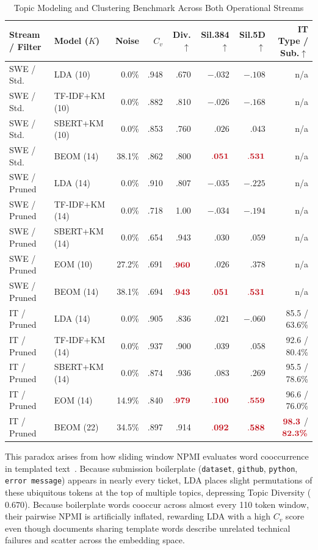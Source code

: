 \documentclass[sigconf,nonacm,pbalance]{acmart}
\newcommand{\hl}[1]{\textcolor{hlred}{\mathbf{#1}}}
\newcommand{\hlt}[1]{\textcolor{hlred}{\textbf{#1}}}
\begin{document}
\begin{table}[!htbp]
  \caption{Topic Modeling and Clustering Benchmark Across Both Operational Streams}
  \label{tab:exp1}
  \footnotesize
  \setlength{\tabcolsep}{1.35pt}
  \begin{tabular}{llrrrrrr}
    \toprule
    Stream / Filter & Model ($K$) & Noise & $C_v$ & Div.$\uparrow$ & Sil.384$\uparrow$ & Sil.5D$\uparrow$ & IT Type / Sub.$\uparrow$ \\
    \midrule
    SWE / Std. & LDA (10) & 0.0\% & .948 & .670 & $-.032$ & $-.108$ & n/a \\
    SWE / Std. & TF-IDF+KM (10) & 0.0\% & .882 & .810 & $-.026$ & $-.168$ & n/a \\
    SWE / Std. & SBERT+KM (10) & 0.0\% & .853 & .760 & $.026$ & $.043$ & n/a \\
    SWE / Std. & BEOM (14) & 38.1\% & .862 & .800 & $\hl{.051}$ & $\hl{.531}$ & n/a \\
    \addlinespace[2pt]
    SWE / Pruned & LDA (14) & 0.0\% & .910 & .807 & $-.035$ & $-.225$ & n/a \\
    SWE / Pruned & TF-IDF+KM (14) & 0.0\% & .718 & 1.00 & $-.034$ & $-.194$ & n/a \\
    SWE / Pruned & SBERT+KM (14) & 0.0\% & .654 & .943 & $.030$ & $.059$ & n/a \\
    SWE / Pruned & EOM (10) & 27.2\% & .691 & $\hl{.960}$ & $.026$ & $.378$ & n/a \\
    SWE / Pruned & BEOM (14) & 38.1\% & .694 & $\hl{.943}$ & $\hl{.051}$ & $\hl{.531}$ & n/a \\
    \addlinespace[2pt]
    IT / Pruned & LDA (14) & 0.0\% & .905 & .836 & $.021$ & $-.060$ & 85.5 / 63.6\% \\
    IT / Pruned & TF-IDF+KM (14) & 0.0\% & .937 & .900 & $.039$ & $.058$ & 92.6 / 80.4\% \\
    IT / Pruned & SBERT+KM (14) & 0.0\% & .874 & .936 & $.083$ & $.269$ & 95.5 / 78.6\% \\
    IT / Pruned & EOM (14) & 14.9\% & .840 & $\hl{.979}$ & $\hl{.100}$ & $\hl{.559}$ & 96.6 / 76.0\% \\
    IT / Pruned & BEOM (22) & 34.5\% & .897 & .914 & $\hl{.092}$ & $\hl{.588}$ & $\hlt{98.3}$ / $\hlt{82.3\%}$ \\
    \bottomrule
  \end{tabular}
\end{table}

This paradox arises from how sliding window NPMI evaluates word cooccurrence in templated text~\cite{hoyle2021automated}. Because submission boilerplate (\texttt{dataset}, \texttt{github}, \texttt{python}, \texttt{error message}) appears in nearly every ticket, LDA places slight permutations of these ubiquitous tokens at the top of multiple topics, depressing Topic Diversity ($0.670$). Because boilerplate words cooccur across almost every 110 token window, their pairwise NPMI is artificially inflated, rewarding LDA with a high $C_v$ score even though documents sharing template words describe unrelated technical failures and scatter across the embedding space.
\end{document}
